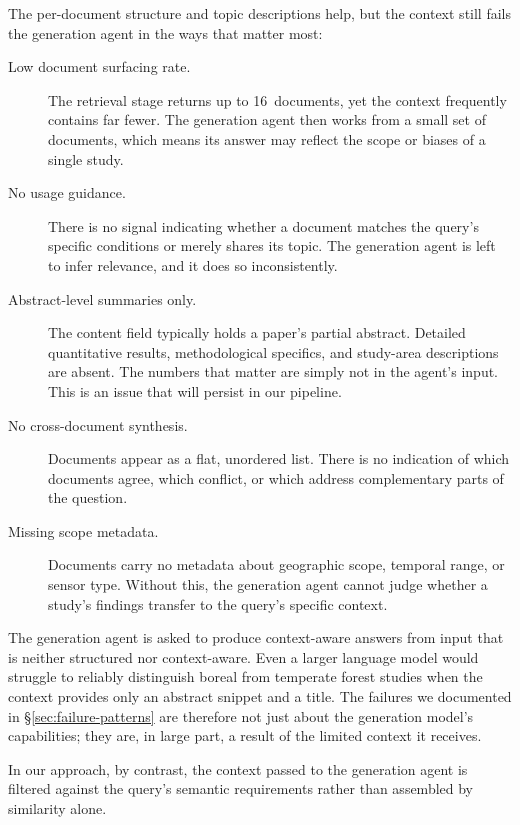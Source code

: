 The per-document structure and topic descriptions help, but the context still fails the generation agent in the ways that matter most:

\begin{description}
\item[Low document surfacing rate.] The retrieval stage returns up to 16~documents, yet the context frequently contains far fewer. The generation agent then works from a small set of documents, which means its answer may reflect the scope or biases of a single study.

\item[No usage guidance.] There is no signal indicating whether a document matches the query's specific conditions or merely shares its topic. The generation agent is left to infer relevance, and it does so inconsistently.

\item[Abstract-level summaries only.] The content field typically holds a paper's partial abstract. Detailed quantitative results, methodological specifics, and study-area descriptions are absent. The numbers that matter are simply not in the agent's input. This is an issue that will persist in our pipeline.

\item[No cross-document synthesis.] Documents appear as a flat, unordered list. There is no indication of which documents agree, which conflict, or which address complementary parts of the question.

\item[Missing scope metadata.] Documents carry no metadata about geographic scope, temporal range, or sensor type. Without this, the generation agent cannot judge whether a study's findings transfer to the query's specific context.
\end{description}

The generation agent is asked to produce context-aware answers from input that is neither structured nor context-aware. Even a larger language model would struggle to reliably distinguish boreal from temperate forest studies when the context provides only an abstract snippet and a title. The failures we documented in \S\ref{sec:failure-patterns} are therefore not just about the generation model's capabilities; they are, in large part, a result of the limited context it receives.

In our approach, by contrast, the context passed to the generation agent is filtered against the query's semantic requirements rather than assembled by similarity alone.

